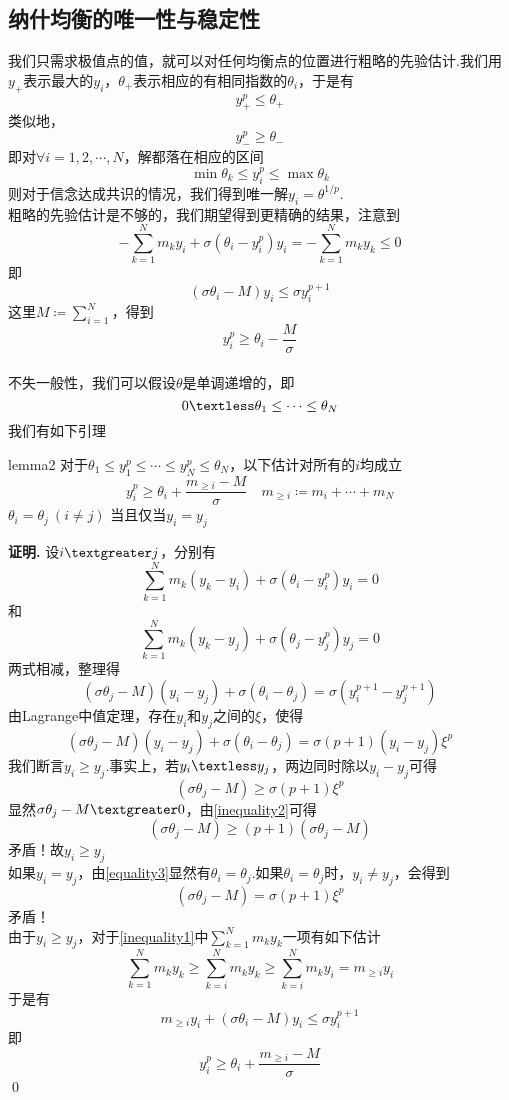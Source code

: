 \documentclass[11pt,a4paper]{article}
\theoremstyle{definition}
\renewenvironment{proof}{\par\textbf{证明.}\;}{\qed\par}
\begin{document}
	\subsection{纳什均衡的唯一性与稳定性}
	我们只需求极值点的值，就可以对任何均衡点的位置进行粗略的先验估计.我们用$y_{+}$表示最大的$y_{i}$，$\theta_{+}$表示相应的有相同指数的$\theta_{i}$，于是有\[ y_{+}^{p}\leq\theta_{+} \]类似地，\[ y_{-}^{p}\geq\theta_{-} \]即对$\forall i=1,2,\cdots,N$，解都落在相应的区间\[ \min\theta_{k}\leq y_{i}^{p}\leq \max\theta_{k} \]
	则对于信念达成共识的情况，我们得到唯一解$y_{i}=\theta^{1/p}$.\\
	粗略的先验估计是不够的，我们期望得到更精确的结果，注意到
	\begin{equation}\label{inequality1}
		-\sum_{k=1}^{N}m_{k}y_{i}+\sigma(\theta_{i}-y_{i}^{p})y_{i}=-\sum_{k=1}^{N}m_{k}y_{k}\leq0 
	\end{equation} 
	即\[ (\sigma\theta_{i}-M)y_{i}\leq\sigma y_{i}^{p+1}\]这里$M\coloneqq\sum_{i=1}^{N}$，得到
	\begin{equation}\label{inequality2}
		y_{i}^{p}\geq\theta_{i}-\dfrac{M}{\sigma} 
	\end{equation}
	\\不失一般性，我们可以假设$\theta$是单调递增的，即\[ 0\textless\theta_{1}\leq\cdots\leq\theta_{N} \]我们有如下引理
	\begin{lemma}{}{lemma2}
		对于$\theta_{1}\leq y_{1}^{p}\leq\cdots\leq y_{N}^{p}\leq\theta_{N}$，以下估计对所有的$i$均成立\[ y_{i}^{p}\geq\theta_{i}+\dfrac{m_{\geq i}-M}{\sigma} \quad m_{\geq i}\coloneqq m_{i}+\cdots+m_{N}\]
		$\theta_{i}=\theta_{j}\ (i\neq j)$ 当且仅当$y_{i}=y_{j}$
	\end{lemma}
	\begin{proof}
		设$i\textgreater j$，分别有\[ \sum_{k=1}^{N}m_{k}(y_{k}-y_{i})+\sigma(\theta_{i}-y_{i}^{p})y_{i}=0 \]和\[ \sum_{k=1}^{N}m_{k}(y_{k}-y_{j})+\sigma(\theta_{j}-y_{j}^{p})y_{j}=0 \]两式相减，整理得
		\begin{equation}\label{equality3}
			(\sigma\theta_{j}-M)(y_{i}-y_{j})+\sigma(\theta_{i}-\theta_{j})=\sigma(y_{i}^{p+1}-y_{j}^{p+1})
		\end{equation} 
		由Lagrange中值定理，存在$y_{i}$和$y_{j}$之间的$\xi$，使得\[ (\sigma\theta_{j}-M)(y_{i}-y_{j})+\sigma(\theta_{i}-\theta_{j})=\sigma(p+1)(y_{i}-y_{j})\xi^{p} \]我们断言$y_{i}\geq y_{j}$.事实上，若$y_{i}\textless y_{j}$，两边同时除以$y_{i}-y_{j}$可得\[ (\sigma\theta_{j}-M)\geq\sigma(p+1)\xi^{p} \]显然$\sigma\theta_{j}-M\textgreater0$，由\eqref{inequality2}可得\[ (\sigma\theta_{j}-M)\geq(p+1)(\sigma\theta_{j}-M) \]矛盾！故$y_{i}\geq y_{j}$\\
		如果$y_{i}=y_{j}$，由\eqref{equality3}显然有$\theta_{i}=\theta_{j}$.如果$\theta_{i}=\theta_{j}$时，$y_{i}\neq y_{j}$，会得到\[ (\sigma\theta_{j}-M)=\sigma(p+1)\xi^{p}  \]矛盾！\\
		由于$y_{i}\geq y_{j}$，对于\eqref{inequality1}中$\sum_{k=1}^{N}m_{k}y_{k}$一项有如下估计\[ \sum_{k=1}^{N}m_{k}y_{k}\geq\sum_{k=i}^{N}m_{k}y_{k}\geq\sum_{k=i}^{N}m_{k}y_{i}=m_{\geq i}y_{i} \]
		于是有\[ m_{\geq i}y_{i}+(\sigma\theta_{i}-M)y_{i}\leq\sigma y_{i}^{p+1} \]
		即\[ y_{i}^{p}\geq\theta_{i}+\dfrac{m_{\geq i}-M}{\sigma} \]
	\end{proof}
\end{document}
